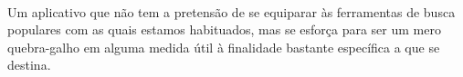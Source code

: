 \documentclass[a4paper,12pt,openany]{book}
\begin{document}
{\begin{minipage}{18cm}
\paragraph{}
Um aplicativo que não tem a pretensão de se equiparar às ferramentas de busca populares com as quais estamos habituados, mas se esforça para ser um mero quebra-galho em alguma medida útil à finalidade bastante específica a que se destina.\\\\\\\\\\\\\\\\\\\\\\\\\\\\\\\\


\end{minipage}


}%

\newpage

\end{document}
